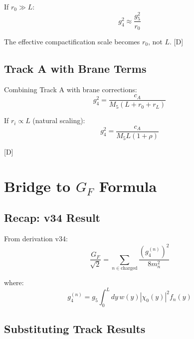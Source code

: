 \documentclass[11pt,a4paper]{article}
\newcommand{\tagD}{\textcolor{blue!70!black}{[D]}}
\begin{document}
If $r_0 \gg L$:
\begin{equation}
\label{eq:large-brane}
g_4^2 \approx \frac{g_5^2}{r_0}
\end{equation}

The effective compactification scale becomes $r_0$, not $L$. \tagD

\subsection{Track A with Brane Terms}

Combining Track A with brane corrections:
\begin{equation}
\label{eq:track-a-brane}
g_4^2 = \frac{c_A}{M_5(L + r_0 + r_L)}
\end{equation}

If $r_i \propto L$ (natural scaling):
\begin{equation}
\label{eq:track-a-brane-scale}
g_4^2 = \frac{c_A}{M_5 L (1 + \rho)}
\end{equation}

\tagD

\section{Bridge to $G_F$ Formula}

\subsection{Recap: v34 Result}

From derivation v34:
\begin{equation}
\label{eq:GF-v34}
\frac{G_F}{\sqrt{2}} = \sum_{n \in \text{charged}} \frac{(g_4^{(n)})^2}{8 m_n^2}
\end{equation}

where:
\begin{equation}
\label{eq:g4n-overlap}
g_4^{(n)} = g_5 \int_0^L dy\, w(y) |\chi_0(y)|^2 f_n(y)
\end{equation}

\subsection{Substituting Track Results}
\end{document}
